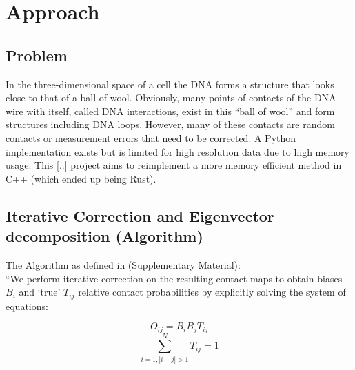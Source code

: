 \chapter{Approach}\label{chap:approach}





\section{Problem}\label{sec:problem}

In the three-dimensional space of a cell the DNA forms a structure that looks
close to that of a ball of wool. Obviously, many points of contacts of the DNA
wire with itself, called DNA interactions, exist in this ``ball of wool'' and
form structures including DNA loops. However, many of these contacts are
random contacts or measurement errors that need to be corrected. A Python
implementation exists but is limited for high resolution data due to high
memory usage. This [..] project aims to reimplement a more memory efficient
method in C++ (which ended up being Rust).



\section{Iterative Correction and Eigenvector decomposition (Algorithm)}\label{sec:ICE}




The Algorithm as defined in \cite{imakaev2012iterative} (Supplementary Material): \\
``We perform iterative correction on the resulting contact maps to obtain
biases $B_i$ and `true' $T_{ij}$ relative contact probabilities by explicitly
solving the system of equations:

$$ O_{ij} = B_i B_j T_{ij} $$
$$ \sum^N_{i=1, |i-j|>1} T_{ij} = 1$$

